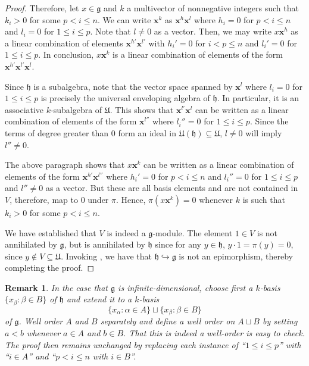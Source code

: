 \documentclass[12pt]{article}
\theoremstyle{thmstyle}
\theoremstyle{defstyle}
\newtheorem{remark}[theorem]{Remark}
\newcommand{\frakg}{\mathfrak{g}}
\newcommand{\frakh}{\mathfrak{h}}
\newcommand{\frakU}{\mathfrak{U}}
\newcommand{\into}{\hookrightarrow}
\renewcommand{\le}{\leqslant}
\begin{document}
\begin{proof}
    Therefore, let $x\in\frakg$ and $k$ a multivector of nonnegative integers such that $k_i > 0$ for some $p < i\le n$. We can write $\mathbf{x}^k$ as $\mathbf{x}^h\mathbf{x}^l$ where $h_i = 0$ for $p < i\le n$ and $l_i = 0$ for $1\le i\le p$. Note that $l\ne 0$ as a vector. Then, we may write $x\mathbf{x}^h$ as a linear combination of elements $\mathbf{x}^{h'}\mathbf{x}^{l'}$ with $h_i' = 0$ for $i < p\le n$ and $l_i' = 0$ for $1\le i\le p$. In conclusion, $x\mathbf{x}^k$ is a linear combination of elements of the form $\mathbf{x}^{h'}\mathbf{x}^{l'}\mathbf{x}^{l}$.

    Since $\frakh$ is a subalgebra, note that the vector space spanned by $\mathbf{x}^{l}$ where $l_i = 0$ for $1\le i\le p$ is precisely the universal enveloping algebra of $\frakh$. In particular, it is an associative $k$-subalgebra of $\frakU$. This shows that $\mathbf{x}^{l'}\mathbf{x}^{l}$ can be written as a linear combination of elements of the form $\mathbf{x}^{l''}$ where $l_i'' = 0$ for $1\le i\le p$. Since the terms of degree greater than $0$ form an ideal in $\frakU(\frakh)\subseteq\frakU$, $l\ne 0$ will imply $l''\ne 0$. 

    The above paragraph shows that $x\mathbf{x}^k$ can be written as a linear combination of elements of the form $\mathbf{x}^{h'}\mathbf{x}^{l''}$ where $h_i' = 0$ for $p < i\le n$ and $l_i'' = 0$ for $1\le i\le p$ and $l''\ne 0$ as a vector. But these are all basis elements and are not contained in $V$, therefore, map to $0$ under $\pi$. Hence, $\pi(x\mathbf{x}^k) = 0$ whenever $k$ is such that $k_i > 0$ for some $p < i\le n$.

    We have established that $V$ is indeed a $\frakg$-module. The element $1\in V$ is not annihilated by $\frakg$, but is annihilated by $\frakh$ since for any $y\in\frakh$, $y\cdot 1 = \pi(y) = 0$, since $y\notin V\subseteq\frakU$. Invoking , we have that $\frakh\into\frakg$ is not an epimorphism, thereby completing the proof.
\end{proof}

\begin{remark}
    In the case that $\frakg$ is infinite-dimensional, choose first a $k$-basis $\{x_\beta\colon\beta\in B\}$ of $\frakh$ and extend it to a $k$-basis 
    \begin{equation*}
        \{x_\alpha\colon\alpha\in A\}\sqcup\{x_\beta\colon \beta\in B\}
    \end{equation*}
    of $\frakg$. Well order $A$ and $B$ separately and define a well order on $A\sqcup B$ by setting $a < b$ whenever $a\in A$ and $b\in B$. That this is indeed a well-order is easy to check. The proof then remains unchanged by replacing each instance of ``$1\le i\le p$'' with ``$i\in A$'' and ``$p < i\le n$ with $i\in B$''.
\end{remark}
\end{document}
